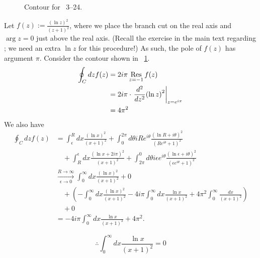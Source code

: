 \item

\begin{figure}[h]
	\centering
	\caption{Contour for ~3--24.}%
	\label{fig:problem3-24}
\end{figure}

Let $f(z) := \frac{{\left( \ln z \right)}^2}{{\left( z + 1 \right)}^2}$,
where we place the branch cut on the real axis and $\arg z = 0$ just above the real axis.
(Recall the exercise in the main text regarding ;
we need an extra $\ln z$ for this procedure!)
As such, the pole of $f(z)$ has argument $\pi$.
Consider the contour shown in ~\ref{fig:problem3-24}.
\begin{align*}
	\oint_C dz f(z)
	&= 2i\pi \mathop{\mathrm{Res}}_{z=-1} f(z) \\
	&= 2i\pi \cdot {\left. \frac{d^2}{dz^2} {\left( \ln z \right)}^2 \right|}_{z = e^{i\pi}} \\
	&= 4\pi^2
\end{align*}
We also have
\begin{align*} %
    \oint_C dz f(z)
    &= \int_\epsilon^R dx \frac{{\left( \ln x \right)}^2}{{\left( x + 1 \right)}^2}
      + \int_0^{2\pi} d\theta iRe^{i\theta} \frac{{\left( \ln R + i\theta\right)}^2}{{\left( Re^{i\theta} + 1 \right)}^2} \\
    &\quad + \int_R^\epsilon dx \frac{{\left( \ln x + 2i\pi \right)}^2}{{\left( x + 1 \right)}^2}
      + \int_{2\pi}^0 d\theta i\epsilon e^{i\theta} \frac{{\left(\ln\epsilon + i\theta\right)}^2}{{\left( \epsilon e^{i\theta} + 1 \right)}^2} \\
    &\xrightarrow[\epsilon \rightarrow 0]{R \rightarrow \infty}
     \int_0^\infty dx \frac{{\left( \ln x \right)}^2}{{\left( x + 1 \right)}^2} + 0 \\
    &\quad + \left(
        - \int_0^\infty dx \frac{{\left( \ln x \right)}^2}{{\left( x + 1 \right)}^2}
        - 4i\pi \int_0^\infty dx \frac{\ln x}{{\left( x + 1 \right)}^2}
        + 4\pi^2 \int_0^\infty \frac{dx}{{\left( x + 1 \right)}^2}
     \right) \\
    &\quad + 0 \\
    &= -4i\pi \int_0^\infty dx \frac{\ln x}{{\left( x + 1 \right)}^2} + 4\pi^2.
\end{align*}

\[
	\therefore \int_0^\infty dx \frac{\ln x}{{\left( x + 1 \right)}^2} = 0
\]
